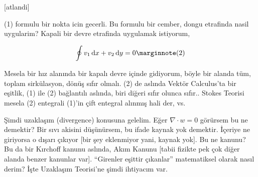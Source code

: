 \documentclass[12pt,fleqn]{article}\usepackage{../../common}
\begin{document}
[atlandi]

(1) formulu bir nokta icin gecerli. Bu formulu bir cember, dongu etrafinda
nasil uygularim? Kapali bir devre etrafinda uygulamak istiyorum,

$$
\oint v_1 \ud x + v_2 \ud y = 0
\mlabel{2}
$$
 
Mesela bir hız alanında bir kapalı devre içinde gidiyorum, böyle bir alanda tüm,
toplam sirkülasyon, dönüş sıfır olmalı. (2) de aslında Vektör Calculus'ta bir
eşitlik, (1) ile (2) bağlantılı aslında, biri diğeri sıfır olunca sıfır..
Stokes Teorisi mesela (2) entegrali (1)'in çift entegral alınmış hali der, vs.

Şimdi uzaklaşım (divergence) konusuna gelelim. Eğer $\nabla \cdot w = 0$
görürsem bu ne demektir? Bir sıvı akisini düşünürsem, bu ifade kaynak yok
demektir. İçeriye ne giriyorsa o dışarı çıkıyor [bir şey eklenmiyor yani, kaynak
yok]. Bu ne kanunu? Bu da bir Kırchoff kanunu aslında, Akım Kanunu [tabii
fizikte pek çok diğer alanda benzer kanunlar var]. ``Girenler eşittir çıkanlar''
matematiksel olarak nasıl derim? İşte Uzaklaşım Teorisi'ne şimdi ihtiyacım var.
\end{document}
